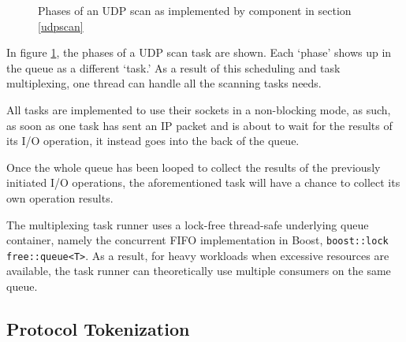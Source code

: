 \documentclass[a4paper,12pt]{article}
\begin{document}
	\begin{figure}[!htbp]
		\centering
		\caption{Phases of an UDP scan as implemented by component in section \ref{udpscan}}
		\label{taskudp}
	\end{figure}
	
	In figure \ref{taskudp}, the phases of a UDP scan task are shown. Each `phase' shows up in the queue as a different `task.' As a result of this scheduling and task multiplexing, one thread can handle all the scanning tasks needs.
	
	All tasks are implemented to use their sockets in a non-blocking mode, as such, as soon as one task has sent an IP packet and is about to wait for the results of its I/O operation, it instead goes into the back of the queue.
	
	Once the whole queue has been looped to collect the results of the previously initiated I/O operations, the aforementioned task will have a chance to collect its own operation results.
	
	The multiplexing task runner uses a lock-free thread-safe underlying queue container, namely the concurrent FIFO implementation in Boost, \texttt{boost::lock free::queue<T>}. As a result, for heavy workloads when excessive resources are available, the task runner can theoretically use multiple consumers on the same queue.
	
\subsection{Protocol Tokenization} \label{tokenizer}
 
	
\end{document}
